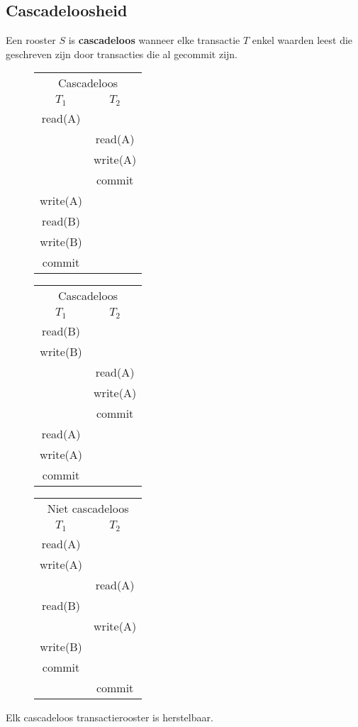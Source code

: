 \documentclass[transacties.tex]{subfiles}
\begin{document}
\subsection{Cascadeloosheid}
\begin{de}
Een rooster $S$ is \textbf{cascadeloos} wanneer elke transactie $T$ enkel waarden leest die geschreven zijn door transacties die al gecommit zijn.
\end{de}
\begin{figure}[H]
\centering
\begin{tabular}{c|c}
\multicolumn{2}{c}{Cascadeloos}\\
$T_1$&$T_2$\\
\hline
read(A) &\\
& read(A)\\
&write(A)\\
&commit\\
write(A)&\\
read(B)&\\
write(B)&\\
commit&
\end{tabular}
\begin{tabular}{c|c}
\multicolumn{2}{c}{Cascadeloos}\\
$T_1$&$T_2$\\
\hline
read(B)&\\
write(B)&\\
& read(A)\\
&write(A)\\
&commit\\
read(A) &\\
write(A)&\\
commit&
\end{tabular}
\begin{tabular}{c|c}
\multicolumn{2}{c}{Niet cascadeloos}\\
$T_1$&$T_2$\\
\hline
read(A) &\\
write(A)&\\
& read(A)\\
read(B)&\\
&write(A)\\
write(B)&\\
commit&\\
&commit\\
\end{tabular}
\end{figure}
\begin{ei}
Elk cascadeloos transactierooster is herstelbaar.
\end{ei}
\end{document}
